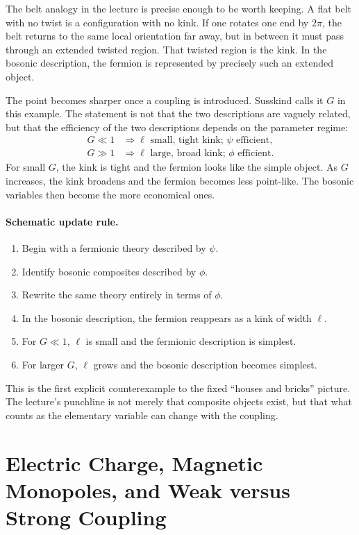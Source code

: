 The belt analogy in the lecture is precise enough to be worth keeping. A flat belt with no twist is a configuration with no kink. If one rotates one end by \(2\pi\), the belt returns to the same local orientation far away, but in between it must pass through an extended twisted region. That twisted region is the kink. In the bosonic description, the fermion is represented by precisely such an extended object.

The point becomes sharper once a coupling is introduced. Susskind calls it \(G\) in this example. The statement is not that the two descriptions are vaguely related, but that the efficiency of the two descriptions depends on the parameter regime:
\begin{align}
G \ll 1
&\Rightarrow
\ell\text{ small, tight kink; }\psi\text{ efficient},\\
G \gg 1
&\Rightarrow
\ell\text{ large, broad kink; }\phi\text{ efficient}.
\end{align}
For small \(G\), the kink is tight and the fermion looks like the simple object. As \(G\) increases, the kink broadens and the fermion becomes less point-like. The bosonic variables then become the more economical ones.

\paragraph{Schematic update rule.}
\begin{enumerate}
\item Begin with a fermionic theory described by \(\psi\).
\item Identify bosonic composites described by \(\phi\).
\item Rewrite the same theory entirely in terms of \(\phi\).
\item In the bosonic description, the fermion reappears as a kink of width \(\ell\).
\item For \(G\ll 1\), \(\ell\) is small and the fermionic description is simplest.
\item For larger \(G\), \(\ell\) grows and the bosonic description becomes simplest.
\end{enumerate}

This is the first explicit counterexample to the fixed ``houses and bricks'' picture. The lecture's punchline is not merely that composite objects exist, but that what counts as the elementary variable can change with the coupling.

\section{Electric Charge, Magnetic Monopoles, and Weak versus Strong Coupling}

